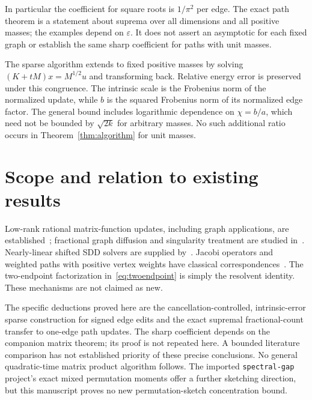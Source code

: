 \documentclass[11pt]{article}
\begin{document}
In particular the coefficient for square roots is $1/\pi^2$ per edge.
The exact path theorem is a statement about suprema over all dimensions
and all positive masses; the examples depend on $\varepsilon$. It does
not assert an asymptotic for each fixed graph or establish the same
sharp coefficient for paths with unit masses.

The sparse algorithm extends to fixed positive masses by solving
$(K+tM)x=M^{1/2}u$ and transforming back. Relative energy error is
preserved under this congruence. The intrinsic scale is the Frobenius
norm of the normalized update, while $b$ is the squared Frobenius norm
of its normalized edge factor. The general bound includes logarithmic
dependence on $\chi=b/a$, which need not be bounded by $\sqrt{2k}$
for arbitrary masses. No such additional ratio occurs in
Theorem~\ref{thm:algorithm} for unit masses.

\section{Scope and relation to existing results}
Low-rank rational matrix-function updates, including graph applications,
are established~\cite{BCKS}; fractional graph diffusion and singularity
treatment are studied in~\cite{BS}. Nearly-linear shifted SDD solvers
are supplied by~\cite{KMP}. Jacobi operators and weighted paths with
positive vertex weights have classical correspondences~\cite{CEM}.
The two-endpoint factorization in~\eqref{eq:twoendpoint} is simply the
resolvent identity. These mechanisms are not claimed as new.

The specific deductions proved here are the cancellation-controlled,
intrinsic-error sparse construction for signed edge edits and the exact
supremal fractional-count transfer to one-edge path updates. The sharp
coefficient depends on the companion matrix theorem; its proof is not
repeated here. A bounded literature comparison has not established
priority of these precise conclusions. No general quadratic-time matrix
product algorithm follows. The imported \texttt{spectral-gap} project's
exact mixed permutation moments offer a further sketching direction,
but this manuscript proves no new permutation-sketch concentration bound.
\end{document}
